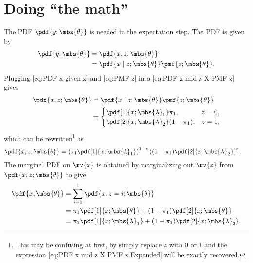 \documentclass{tufte-handout}
\begin{document}
    \section{Doing ``the math''}
    The PDF $\pdf{y; \mbs{\theta}}$ is needed in the expectation step. The PDF is given by
    \begin{align}
        \pdf{y; \mbs{\theta}} 
        &= \pdf{x, z; \mbs{\theta}}\\
        \label{eq:PDF x mid z X PMF z}
        &= \pdf{x \mid z; \mbs{\theta}}\pmf{z; \mbs{\theta}}.        
    \end{align}
    Plugging \eqref{eq:PDF x given z} and \eqref{eq:PMF z} into  \eqref{eq:PDF x mid z X PMF z} gives
    \begin{align}
        \pdf{x, z; \mbs{\theta}}  &=
        \pdf{x \mid z; \mbs{\theta}}\pmf{z; \mbs{\theta}} \\
        \label{eq:PDF x mid z X PMF z Expanded}
        &=
        \begin{cases}
            \pdf[1]{x; \mbs{\lambda}_{1}}\pi_{1}, & z=0,\\
            \pdf[2]{x; \mbs{\lambda}_{2}}(1-\pi_{1}), & z=1,
        \end{cases}
    \end{align}
    which can be rewritten\footnote{This may be confusing at first, by simply replace $z$ with $0$ or $1$ and the expression \eqref{eq:PDF x mid z X PMF z Expanded} will be exactly recovered.} as
    \begin{align}
        \pdf{x, z; \mbs{\theta}} 
        &= 
        \left(\pi_{1}\pdf[1]{x; \mbs{\lambda}_{1}}\right)^{1-z}\left( (1-\pi_{1})\pdf[2]{x; \mbs{\lambda}_{2}} \right)^{z}.
    \end{align}
    The marginal PDF on $\rv{x}$ is obtained by marginalizing out $\rv{z}$ from $\pdf{x, z;\mbs{\theta}}$ to give
    \begin{align}
        \pdf{x; \mbs{\theta}} &= \sum_{i=0}^{1}\pdf{x, z=i; \mbs{\theta}}\\
        &= \pi_{1}\pdf[1]{x; \mbs{\theta}} + (1-\pi_{1})\pdf[2]{x; \mbs{\theta}}\\
        \label{eq:PDF x given theta Expanded}
        &= \pi_{1}\pdf[1]{x; \mbs{\lambda}_{1}} + (1-\pi_{1})\pdf[2]{x; \mbs{\lambda}_{2}}.
    \end{align}
\end{document}
